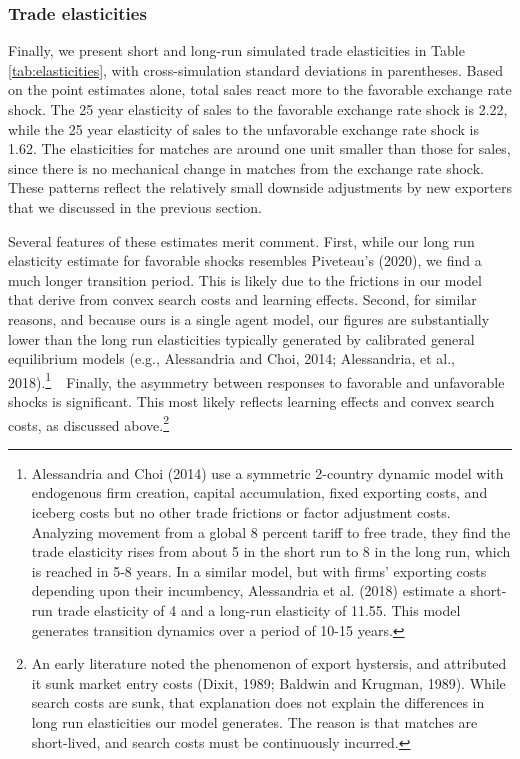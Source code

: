 \documentclass[12pt]{article}
\begin{document}
\subsubsection{Trade elasticities}

Finally, we present short and long-run simulated trade elasticities in Table %
\ref{tab:elasticities}, with cross-simulation standard deviations in
parentheses. Based on the point estimates alone, total sales react more to
the favorable exchange rate shock. The 25 year elasticity of sales to the
favorable exchange rate shock is 2.22, while the 25 year elasticity of sales
to the unfavorable exchange rate shock is 1.62. The elasticities for matches
are around one unit smaller than those for sales, since there is no
mechanical change in matches from the exchange rate shock. These patterns reflect the relatively small downside adjustments by new exporters that we discussed in the previous section.

Several features of these estimates merit comment. First, while our long run
elasticity estimate for favorable shocks resembles Piveteau's (2020), we
find a much longer transition period. This is likely due to the frictions in
our model that derive from convex search costs and learning effects. Second,
for similar reasons, and because ours is a single agent model, our figures
are substantially lower than the long run elasticities typically generated
by calibrated general equilibrium models (e.g., Alessandria and Choi, 2014;
Alessandria, et al., 2018).\footnote{%
Alessandria and Choi (2014) use a symmetric 2-country dynamic model with
endogenous firm creation, capital accumulation, fixed exporting costs, and
iceberg costs but no other trade frictions or factor adjustment costs.
Analyzing movement from a global 8 percent tariff to free trade, they find
the trade elasticity rises from about 5 in the short run to 8 in the long
run, which is reached in 5-8 years. In a similar model, but with firms'
exporting costs depending upon their incumbency, Alessandria et al. (2018)
estimate a short-run trade elasticity of 4 and a long-run elasticity of
11.55. This model generates transition dynamics over a period of 10-15 years.%
}\textbf{\ }\ Finally, the asymmetry between responses to favorable and
unfavorable shocks is significant. This most likely reflects learning
effects and convex search costs, as discussed above.\footnote{%
An early literature noted the phenomenon of export hystersis, and attributed
it sunk market entry costs (Dixit, 1989; Baldwin and Krugman, 1989). While
search costs are sunk, that explanation does not explain the differences in
long run elasticities our model generates. The reason is that matches are
short-lived, and search costs must be continuously incurred.}
\end{document}
